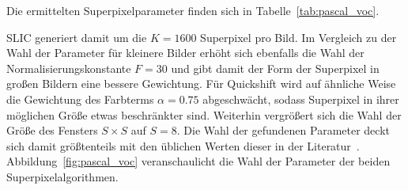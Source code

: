 Die ermittelten Superpixelparameter finden sich in Tabelle~\ref{tab:pascal_voc}.
\begin{table}[t]
\centering
{}
\caption[\gls{Pascal} Superpixelparameter]{Wahl der Superpixelparameter des \gls{Pascal} Datensatzes.}
\label{tab:pascal_voc}
\end{table}
\gls{SLIC} generiert damit um die $K=1600$ Superpixel pro Bild.
Im Vergleich zu der Wahl der Parameter für kleinere Bilder erhöht sich ebenfalls die Wahl der Normalisierungskonstante $F=30$ und gibt damit der Form der Superpixel in großen Bildern eine bessere Gewichtung.
Für Quickshift wird auf ähnliche Weise die Gewichtung des Farbterms $\alpha = 0.75$ abgeschwächt, sodass Superpixel in ihrer möglichen Größe etwas beschränkter sind.
Weiterhin vergrößert sich die Wahl der Größe des Fensters $S \times S$ auf $S = 8$.
Die Wahl der gefundenen Parameter deckt sich damit größtenteils mit den üblichen Werten dieser in der Literatur~\cite{Fulkerson}.
Abbildung~\ref{fig:pascal_voc} veranschaulicht die Wahl der Parameter der beiden Superpixelalgorithmen.


